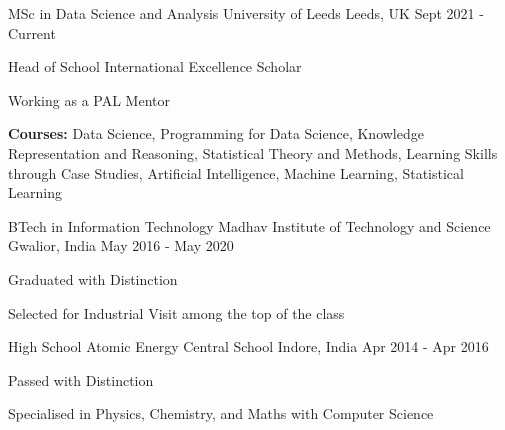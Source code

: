 

\begin{cventries}

  \cventry
    {MSc in Data Science and Analysis} %
    {University of Leeds} %
    {Leeds, UK} %
    {Sept 2021 - Current} %
    {
      \begin{cvitems} %
        \item {Head of School International Excellence Scholar}
        \item {Working as a PAL Mentor}
        \item {\textbf{Courses:} Data Science, Programming for Data Science, Knowledge Representation and Reasoning, Statistical Theory and Methods, Learning Skills through Case Studies, Artificial Intelligence, Machine Learning, Statistical Learning}
      \end{cvitems}
    }
    
  \cventry
    {BTech in Information Technology} %
    {Madhav Institute of Technology and Science} %
    {Gwalior, India} %
    {May 2016 - May 2020} %
    {
      \begin{cvitems} %
        \item {Graduated with Distinction}
        \item {Selected for Industrial Visit among the top of the class} 
      \end{cvitems}
    }
    
  \cventry
    {High School} %
    {Atomic Energy Central School} %
    {Indore, India} %
    {Apr 2014 - Apr 2016} %
    {
      \begin{cvitems} %
        \item {Passed with Distinction}
        \item {Specialised in Physics, Chemistry, and Maths with Computer Science}
      \end{cvitems}
    }
\end{cventries}
